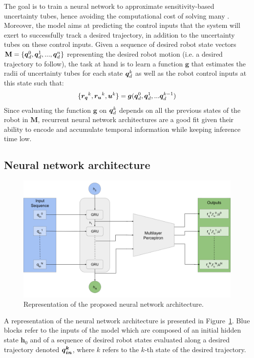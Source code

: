 The goal is to train a neural network to approximate sensitivity-based uncertainty tubes, hence avoiding the computational cost of solving many . 
Moreover, the model aims at predicting the control inputs that the system will exert to successfully track a desired trajectory, in addition to the uncertainty tubes on these control inputs. 
Given a sequence of desired robot state vectors $\textbf{M} = \{\boldsymbol{q}_{d}^0, \boldsymbol{q}_{d}^1, ..., \boldsymbol{q}_{d}^n\}$ representing the desired robot motion (i.e. a desired trajectory to follow), the task at hand is to learn a function $\boldsymbol{g}$ that estimates the radii of uncertainty tubes for each state $\boldsymbol{q}_{d}^k$ as well as the robot control inputs at this state such that:
\begin{equation}\label{eq:prob_statement}
\{\boldsymbol{r_q}^{k}, \boldsymbol{r_u}^{k},\boldsymbol{u}^{k}\} = \boldsymbol{g}(\boldsymbol{q}_{d}^0, \boldsymbol{q}_{d}^1, ... \boldsymbol{q}_{d}^{k-1})
\end{equation}
Since evaluating the function $\boldsymbol{g}$ on $\boldsymbol{q}_{d}^k$ depends on all the previous states of the robot in $\textbf{M}$, recurrent neural network architectures are a good fit given their ability to encode and accumulate temporal information while keeping inference time low.

\subsection{Neural network architecture}\label{sec:architecture}

\begin{figure} [htp]
    \centering
    \includegraphics[width=0.8\linewidth]{figures/learning_quadrotor/SensiNN_GRU.png}%
    \caption{Representation of the proposed neural network architecture.
    }%
    \label{fig: NN}%
\end{figure}

A representation of the neural network architecture is presented in Figure~\ref{fig: NN}.
Blue blocks refer to the inputs of the model which are composed of an initial hidden state $\boldsymbol{h}_{0}$ and of a sequence of desired robot states evaluated along a desired trajectory denoted $\boldsymbol{\boldsymbol{q}_{in}^k}$, where $k$ refers to the $k$-th state of the desired trajectory. 

